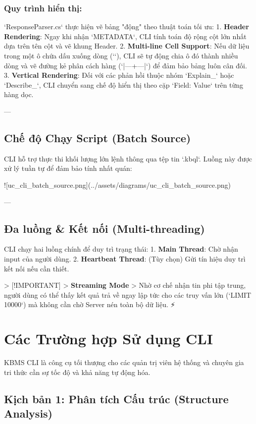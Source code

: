 \subsubsection{Quy trình hiển thị:}
`ResponseParser.cs` thực hiện vẽ bảng "động" theo thuật toán tối ưu:
1.  \textbf{Header Rendering}: Ngay khi nhận `METADATA`, CLI tính toán độ rộng cột lớn nhất dựa trên tên cột và vẽ khung Header.
2.  \textbf{Multi-line Cell Support}: Nếu dữ liệu trong một ô chứa dấu xuống dòng (`\n`), CLI sẽ tự động chia ô đó thành nhiều dòng và vẽ đường kẻ phân cách hàng (`|---+---|`) để đảm bảo bảng luôn cân đối.
3.  \textbf{Vertical Rendering}: Đối với các phản hồi thuộc nhóm `Explain\_` hoặc `Describe\_`, CLI chuyển sang chế độ hiển thị theo cặp `Field: Value` trên từng hàng dọc.

---

\subsection{Chế độ Chạy Script (Batch Source)}

CLI hỗ trợ thực thi khối lượng lớn lệnh thông qua tệp tin `.kbql`. Luồng này được xử lý tuần tự để đảm bảo tính nhất quán:

![uc\_cli\_batch\_source.png](../assets/diagrams/uc\_cli\_batch\_source.png)

---

\subsection{Đa luồng & Kết nối (Multi-threading)}

CLI chạy hai luồng chính để duy trì trạng thái:
1.  \textbf{Main Thread}: Chờ nhận input của người dùng.
2.  \textbf{Heartbeat Thread}: (Tùy chọn) Gửi tín hiệu duy trì kết nối nếu cần thiết.

> [!IMPORTANT]
> \textbf{Streaming Mode}
> Nhờ cơ chế nhận tin phi tập trung, người dùng có thể thấy kết quả trả về ngay lập tức cho các truy vấn lớn (`LIMIT 10000`) mà không cần chờ Server nén toàn bộ dữ liệu. ⚡

\section{Các Trường hợp Sử dụng CLI}

KBMS CLI là công cụ tối thượng cho các quản trị viên hệ thống và chuyên gia tri thức cần sự tốc độ và khả năng tự động hóa.

\subsection{Kịch bản 1: Phân tích Cấu trúc (Structure Analysis)}

